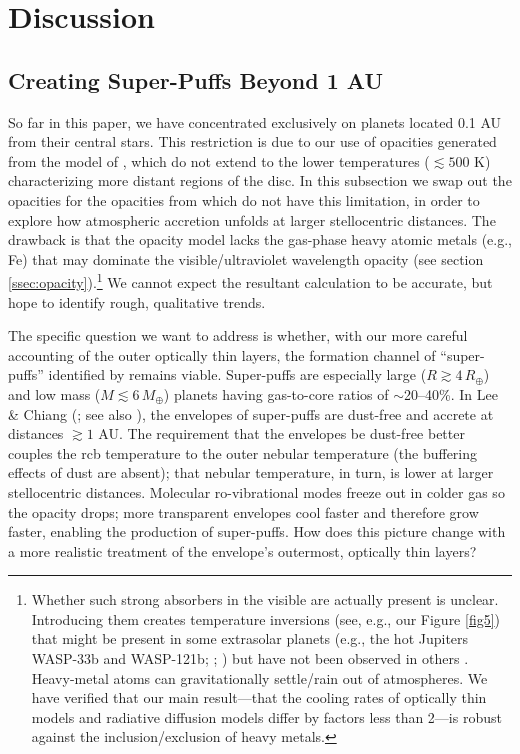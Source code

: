\documentclass[fleqn,useAMS,usenatbib]{mnras}
\begin{document}
\section{Discussion}

\subsection{Creating Super-Puffs Beyond 1 AU}
\label{ssec:1au}

So far in this paper, we have concentrated exclusively on planets
located 0.1 AU from their central stars.
This restriction is due to our use of opacities
generated from the model of \citet{ferguson05}, which 
do not extend to the lower temperatures ($\lesssim 500$ K) 
characterizing more distant
regions of the disc. In this subsection we swap out the \citet{ferguson05}
opacities for the opacities from \citet{freedman14} which do not have this
limitation, in order to explore how atmospheric accretion
unfolds at larger stellocentric distances. The drawback is that 
the \citet{freedman14} opacity model
lacks the gas-phase heavy 
atomic metals (e.g., Fe)
that may dominate
the visible/ultraviolet wavelength opacity
(see section \ref{ssec:opacity}).\footnote{Whether such strong absorbers
in the visible are actually present is unclear. Introducing them
creates temperature inversions (see, e.g., our Figure \ref{fig5})
that might be present
in some extrasolar planets (e.g., the hot Jupiters WASP-33b and WASP-121b;
\citealt{haynes15}; \citealt{evans16}) but have not been
observed in others \citep[e.g., HD 209458b;][]{diamond-lowe14,line16}.
Heavy-metal atoms can gravitationally settle/rain out of atmospheres.
We have verified that our main result---that the cooling rates of optically thin models and radiative diffusion models differ by factors less than 2---is robust against the inclusion/exclusion of heavy metals.
}
We cannot expect the resultant calculation to be accurate,
but hope to identify rough, qualitative trends.

The specific question we want to address is whether, with our more
careful accounting of the outer optically thin layers,
the formation channel of ``super-puffs'' identified by \citet{paper3}
remains viable. Super-puffs are especially large ($R \gtrsim 4\,R_\oplus$) and low mass ($M \lesssim 6\,M_\oplus$) planets having gas-to-core ratios
of $\sim$20--40\%. In Lee \& Chiang (\citeyear{paper3}; see also
\citealt{inamdar15}), the envelopes of super-puffs are dust-free
and accrete at distances $\gtrsim 1$ AU. The requirement that the envelopes
be dust-free better couples the rcb temperature to the outer nebular
temperature (the buffering effects of dust are absent); that nebular
temperature, in turn, is lower at larger stellocentric
distances. 
Molecular ro-vibrational modes freeze out in colder gas so the opacity drops; more transparent envelopes cool faster and therefore grow faster, enabling
the production of super-puffs.
How does this picture change with a more realistic treatment
of the envelope's outermost, optically thin layers?
\end{document}
